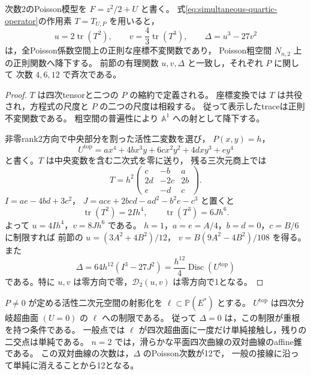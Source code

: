 \begin{proposition}[零方向を含む正則不変量]
\label{prop:degree-two-regular-trace-invariants}
次数2のPoisson模型を $F=z^2/2+U$ と書く。
式\eqref{eq:simultaneous-quartic-operator}の作用素 $T=T_{U,P}$ を用いると，
\[
 u=2\operatorname{tr}(T^2),\qquad
 v=\frac43\operatorname{tr}(T^3),\qquad
 \Delta=u^3-27v^2
\]
は，全Poisson係数空間上の正則な座標不変関数であり，
Poisson粗空間 $N_{n,2}$ 上の正則関数へ降下する。
前節の有理関数 $u,v,\Delta$ と一致し，それぞれ $P$ に関して
次数 $4,6,12$ で斉次である。
\end{proposition}
\begin{proof}
$T$ は四次tensorと二つの $P$ の縮約で定義される。
座標変換では $T$ は共役され，方程式の尺度と $P$ の二つの尺度は相殺する。
従って表示したtraceは正則不変関数である。
粗空間の普遍性により $\mathbb A^1$ への射として降下する。

非零rank2方向で中央部分を割った活性二変数を選び，
$P(x,y)=h$，
\[
 U^{\mathrm{top}}=a x^4+4b x^3y+6c x^2y^2+4d xy^3+e y^4
\]
と書く。$T$ は中央変数を含む二次式を零に送り，
残る三次元商上では
\[
 T=h^2
 \begin{pmatrix}c&-b&a\\2d&-2c&2b\\e&-d&c\end{pmatrix}.
\]
$I=ae-4bd+3c^2$，
$J=ace+2bcd-ad^2-b^2e-c^3$ と置くと
\[
 \operatorname{tr}(T^2)=2Ih^4,\qquad
 \operatorname{tr}(T^3)=6Jh^6.
\]
よって $u=4Ih^4$，$v=8Jh^6$ である。
$h=1$，$a=e=A/4$，$b=d=0$，$c=B/6$ に制限すれば
前節の $u=(3A^2+4B^2)/12$，
$v=B(9A^2-4B^2)/108$ を得る。
また
\[
 \Delta=64h^{12}(I^3-27J^2)
       =\frac{h^{12}}4\operatorname{Disc}(U^{\mathrm{top}})
\]
である。特に $u,v$ は零方向で零，$\mathscr D_2(u,v)$ は零方向で1となる。
\end{proof}

\begin{remark}[中央変数を含む幾何学的意味]
$P\ne0$ が定める活性二次元空間の射影化を
$\ell\subset\mathbb P(E^*)$ とする。
$U^{\mathrm{top}}$ は四次分岐超曲面 $(U=0)$ の $\ell$ への制限である。
従って $\Delta=0$ は，この制限が重根を持つ条件である。
一般点では $\ell$ が四次超曲面に一度だけ単純接触し，残りの二交点は単純である。
$n=2$ では，滑らかな平面四次曲線の双対曲線のaffine錐である。
この双対曲線の次数は，$\Delta$ のPoisson次数が12で，
一般の接線に沿って単純に消えることから12となる。
\end{remark}

